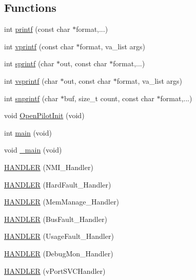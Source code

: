\subsection*{\-Functions}
\begin{DoxyCompactItemize}
\item 
int \hyperlink{group___p_i_o_s_ga98631211a4a8aee62f572375d5b637be}{printf} (const char $\ast$format,...)
\item 
int \hyperlink{group___p_i_o_s_gaae4ab8b56862ed0a04505cafb8a05112}{vprintf} (const char $\ast$format, va\-\_\-list args)
\item 
int \hyperlink{group___p_i_o_s_gaa0649118bc3728b2a62af0b47606ff51}{sprintf} (char $\ast$out, const char $\ast$format,...)
\item 
int \hyperlink{group___p_i_o_s_ga7408e892dd48c6ce39b5821d917a3dd2}{vsprintf} (char $\ast$out, const char $\ast$format, va\-\_\-list args)
\item 
int \hyperlink{group___p_i_o_s_gaf78a52a59a43dc156963dbbab958a468}{snprintf} (char $\ast$buf, size\-\_\-t count, const char $\ast$format,...)
\item 
void \hyperlink{group___p_i_o_s_ga4c168099ccb82fb36167e031a5907c57}{\-Open\-Pilot\-Init} (void)
\item 
int \hyperlink{group___p_i_o_s_ga840291bc02cba5474a4cb46a9b9566fe}{main} (void)
\item 
void \hyperlink{group___p_i_o_s_gabaa8f446abb569a6f850a328569bec9f}{\-\_\-main} (void)
\item 
\hyperlink{group___p_i_o_s_ga22781b76899c3e04d207a6991cc99bf4}{\-H\-A\-N\-D\-L\-E\-R} (\-N\-M\-I\-\_\-\-Handler)
\item 
\hyperlink{group___p_i_o_s_ga3e5203ca6ee79d2c3590d430095858ba}{\-H\-A\-N\-D\-L\-E\-R} (\-Hard\-Fault\-\_\-\-Handler)
\item 
\hyperlink{group___p_i_o_s_ga613a3f3451967f46994b6cda45edb3a1}{\-H\-A\-N\-D\-L\-E\-R} (\-Mem\-Manage\-\_\-\-Handler)
\item 
\hyperlink{group___p_i_o_s_gaa3b3d1c4145924c2bcb1f6ecbbb65de9}{\-H\-A\-N\-D\-L\-E\-R} (\-Bus\-Fault\-\_\-\-Handler)
\item 
\hyperlink{group___p_i_o_s_ga0c2094e67c27767c96a07a3ffa5ce62b}{\-H\-A\-N\-D\-L\-E\-R} (\-Usage\-Fault\-\_\-\-Handler)
\item 
\hyperlink{group___p_i_o_s_gae155b63ec7087004e2fbf61c1f29c81b}{\-H\-A\-N\-D\-L\-E\-R} (\-Debug\-Mon\-\_\-\-Handler)
\item 
\hyperlink{group___p_i_o_s_ga67d6ce2f5112b5c4b1269e6353f23769}{\-H\-A\-N\-D\-L\-E\-R} (v\-Port\-S\-V\-C\-Handler)

\end{DoxyCompactItemize}
